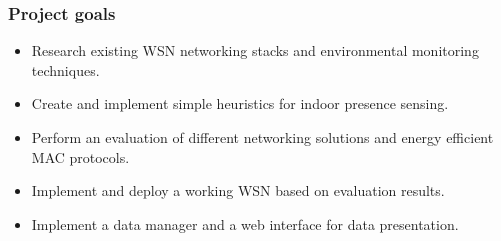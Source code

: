 \documentclass{beamer}
\begin{document}
\begin{frame}
\frametitle{Project goals}

	\begin{block}

		\begin{itemize}\setlength{\itemsep}{4mm}

			\item
              Research existing WSN networking stacks and
              environmental monitoring techniques.
			\item
              Create and implement simple heuristics for indoor
              presence sensing.
			\item
              Perform an evaluation of different networking solutions
              and energy efficient MAC protocols.
			\item
              Implement and deploy a working WSN based on evaluation
              results.
			\item
              Implement a data manager and a web interface for data
              presentation.
		
		\end{itemize}

	\end{block}

\end{frame}
\end{document}
